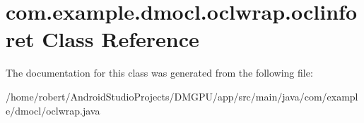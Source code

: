 \hypertarget{classcom_1_1example_1_1dmocl_1_1oclwrap_1_1oclinforet}{}\section{com.\+example.\+dmocl.\+oclwrap.\+oclinforet Class Reference}
\label{classcom_1_1example_1_1dmocl_1_1oclwrap_1_1oclinforet}


The documentation for this class was generated from the following file\+:\begin{DoxyCompactItemize}
\item 
/home/robert/\+Android\+Studio\+Projects/\+D\+M\+G\+P\+U/app/src/main/java/com/example/dmocl/oclwrap.\+java\end{DoxyCompactItemize}
